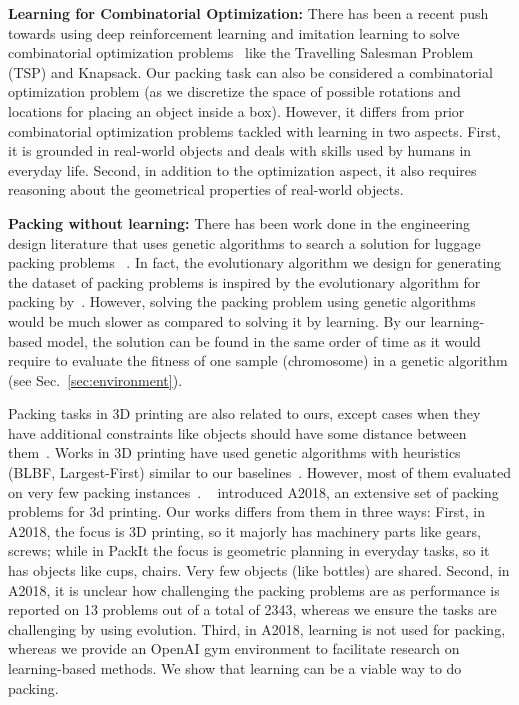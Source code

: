 \documentclass{article}
\begin{document}
\noindent \textbf{Learning for Combinatorial Optimization:} There has been a recent push towards using deep reinforcement learning and imitation learning to solve combinatorial optimization problems~\cite{vinyals2015pointer,bello2016neural,bengio2018machine,gu2018pointer} like the Travelling Salesman Problem (TSP) and Knapsack. Our packing task can also be considered a combinatorial optimization problem (as we discretize the space of possible rotations and locations for placing an object inside a box). However, it differs from prior combinatorial optimization problems tackled with learning in two aspects. First, it is grounded in real-world objects and deals with skills used by humans in everyday life. Second, in addition to the optimization aspect, it also requires reasoning about the geometrical properties of real-world objects.

\noindent \textbf{Packing without learning:} There has been work done in the engineering design literature that uses genetic algorithms to search a solution for luggage packing problems ~\cite{tiwari2010fast,joung2014intelligent,fadel2015packing}. In fact, the evolutionary algorithm we design for generating the dataset of packing problems is inspired by the evolutionary algorithm for packing by~\cite{tiwari2010fast}. However, solving the packing problem using genetic algorithms would be much slower as compared to solving it by learning. By our learning-based model, the solution can be found in the same order of time as it would require to evaluate the fitness of one sample (chromosome) in a genetic algorithm (see Sec.~\ref{sec:environment}). 

Packing tasks in 3D printing are also related to ours, except cases when they have additional constraints like objects should have some distance between them~\cite{araujo2019analysis}. Works in 3D printing have used genetic algorithms with heuristics (BLBF, Largest-First) similar to our baselines~\cite{gogate2008intelligent,canellidis2010effective}. However, most of them evaluated on very few packing instances~\cite{araujo2019analysis}. ~\citep{araujo2019analysis} introduced A2018, an extensive set of packing problems for 3d printing. Our works differs from them in three ways: First, in A2018, the focus is 3D printing, so it majorly has machinery parts like gears, screws; while in PackIt the focus is geometric planning in everyday tasks, so it has objects like cups, chairs. Very few objects (like bottles) are shared. Second, in A2018, it is unclear how challenging the packing problems are as performance is reported on 13 problems out of a total of 2343, whereas we ensure the tasks are challenging by using evolution. Third, in A2018, learning is not used for packing, whereas we provide an OpenAI gym environment to facilitate research on learning-based methods. We show that learning can be a viable way to do packing.
\end{document}
